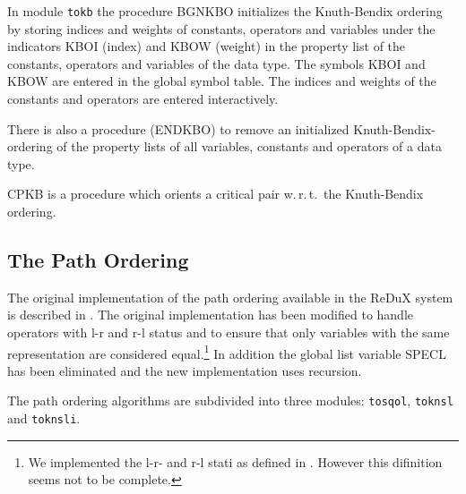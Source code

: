 In module {\tt tokb} the procedure BGNKBO initializes the Knuth-Bendix ordering 
by storing indices and weights of 
constants, operators and variables under the indicators KBOI (index) and
KBOW (weight) in the property list of the constants, operators and variables
of the data type.
The symbols KBOI and KBOW are entered in the global symbol table.
The indices and weights of the constants and operators are entered
interactively.

There is also a procedure (ENDKBO) to remove an initialized 
Knuth-Bendix-ordering
of the property lists of all variables, constants and operators of a data type.

CPKB is a procedure which orients a critical pair w.\,r.\,t.\ the 
Knuth-Bendix ordering.

\subsection{The Path Ordering}

The original implementation of the path ordering 
\cite{KapurNarendranSivakumar:85} 
available in the ReDuX system is described in \cite{Schwaerzler:86}.
The original implementation has been modified to handle operators with
l-r and r-l status and to ensure that only variables with the same 
representation are considered equal.\footnote{We implemented the l-r-
and r-l stati as defined in \cite{KapurNarendranSivakumar:85}.
However this difinition seems not to be complete.}
In addition the global list variable SPECL has been eliminated and the new 
implementation uses recursion.


The path ordering algorithms are subdivided into three modules:
{\tt tosqol}, {\tt toknsl} and {\tt toknsli}.


